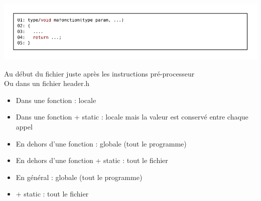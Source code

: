 
\includegraphics[width=\linewidth]{D8_1.pdf}

\par

Au début du fichier juste après les instructions pré-processeur \\
Ou dans un fichier header.h

\par

\begin{itemize}
\item Dans une fonction : locale
\item Dans une fonction + static : locale mais la valeur est conservé entre chaque appel
\item En dehors d'une fonction : globale (tout le programme)
\item En dehors d'une fonction + static : tout le fichier
\end{itemize}

\begin{itemize}
\item En général : globale (tout le programme)
\item + static : tout le fichier
\end{itemize} 
